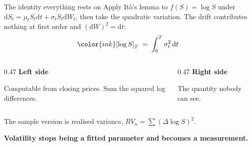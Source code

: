 \documentclass[aspectratio=169,11pt]{beamer}
\newcommand{\lead}[1]{{\sffamily\bfseries\color{accent}#1}}
\newcommand{\dd}{\mathrm{d}}
\begin{document}
\begin{frame}{The identity everything rests on}
Apply It\^o's lemma to $f(S)=\log S$ under $\dd S_t=\mu_tS_t\dd t+\sigma_tS_t\dd W_t$, then take
the quadratic variation. The drift contributes nothing at first order and $(\dd W)^2=\dd t$:
\vspace{-0.2em}
\[{\color{ink}[\log S]_T\;=\;\int_0^T\sigma_t^2\,\dd t}\]
\vspace{-1.0em}
\begin{columns}[T]
\begin{column}{0.47\textwidth}
\lead{Left side}\par Computable from closing prices. Sum the squared log differences.
\end{column}
\begin{column}{0.47\textwidth}
\lead{Right side}\par The quantity nobody can see.
\end{column}
\end{columns}
\vspace{0.8em}
The sample version is realised variance, $RV_n=\sum(\Delta\log S)^2$.\par
\vspace{0.2em}
\lead{Volatility stops being a fitted parameter and becomes a measurement.}
\end{frame}
\end{document}
